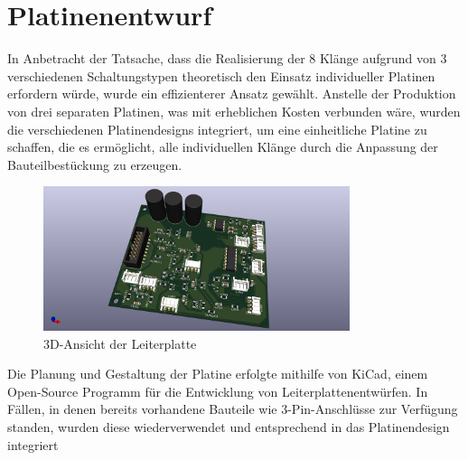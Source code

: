 

\section{Platinenentwurf}
In Anbetracht der Tatsache, dass die Realisierung der 8 Klänge aufgrund von 3 verschiedenen Schaltungstypen theoretisch den Einsatz individueller Platinen erfordern würde, wurde ein effizienterer Ansatz gewählt. Anstelle der Produktion von drei separaten Platinen, was mit erheblichen Kosten verbunden wäre, wurden die verschiedenen Platinendesigns integriert, um eine einheitliche Platine zu schaffen, die es ermöglicht, alle individuellen Klänge durch die Anpassung der Bauteilbestückung zu erzeugen.

\begin{figure}[h]
    \centering
    \includegraphics[width=0.8\textwidth]{Images/KiKAD_Endplatine_V2.png}
    \caption[Leiterplattenentwurf]{3D-Ansicht der Leiterplatte}
    \label{fig:3D-Ansicht der Leiterplatte}
\end{figure}

Die Planung und Gestaltung der Platine erfolgte mithilfe von KiCad, einem Open-Source Programm für die Entwicklung von Leiterplattenentwürfen. In Fällen, in denen bereits vorhandene Bauteile wie 3-Pin-Anschlüsse zur Verfügung standen, wurden diese wiederverwendet und entsprechend in das Platinendesign integriert
